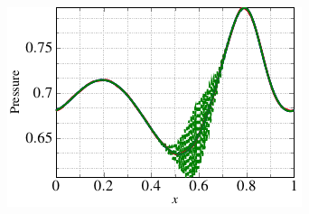 \begin{figure}
\begin{subfigure}[t]{0.47\linewidth}
\end{subfigure} 
\begin{subfigure}[t]{0.47\linewidth}
        \includegraphics[scale=1]{Figures/paper-figure16.pdf}

\end{subfigure}
\end{figure}
